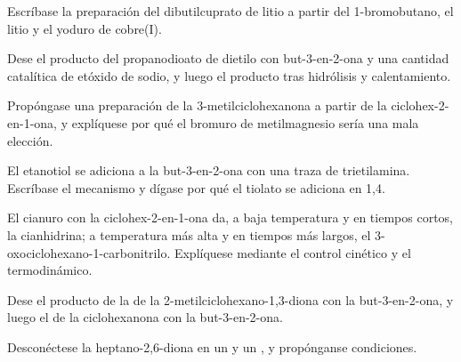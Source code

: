 \begin{exercise}[$\star$]\label{exo:b2:conjugate-additions:3}
Escríbase la preparación del dibutilcuprato de litio a partir del 1-bromobutano, el litio y el yoduro de cobre(I).
\end{exercise}

\begin{exercise}[$\star$]\label{exo:b2:conjugate-additions:4}
Dese el producto del propanodioato de dietilo con but-3-en-2-ona y una cantidad catalítica de etóxido
de sodio, y luego el producto tras hidrólisis y calentamiento.
\end{exercise}

\begin{exercise}[$\star\star$]\label{exo:b2:conjugate-additions:5}
Propóngase una preparación de la 3-metilciclohexanona a partir de la ciclohex-2-en-1-ona, y explíquese por qué
el bromuro de metilmagnesio sería una mala elección.
\end{exercise}

\begin{exercise}[$\star\star$]\label{exo:b2:conjugate-additions:6}
El etanotiol se adiciona a la but-3-en-2-ona con una traza de trietilamina. Escríbase el mecanismo y dígase por qué el
tiolato se adiciona en 1,4.
\end{exercise}

\begin{exercise}[$\star\star$]\label{exo:b2:conjugate-additions:7}
El cianuro con la ciclohex-2-en-1-ona da, a baja temperatura y en tiempos cortos, la cianhidrina; a temperatura más
alta y en tiempos más largos, el 3-oxociclohexano-1-carbonitrilo. Explíquese mediante el control cinético y el
termodinámico.
\end{exercise}

\begin{exercise}[$\star\star$]\label{exo:b2:conjugate-additions:8}
Dese el producto de la  de la 2-metilciclohexano-1,3-diona con la but-3-en-2-ona, y luego el
de la ciclohexanona con la but-3-en-2-ona.
\end{exercise}

\begin{exercise}[$\star\star$]\label{exo:b2:conjugate-additions:9}
Desconéctese la heptano-2,6-diona en un  y un , y propónganse condiciones.
\end{exercise}

